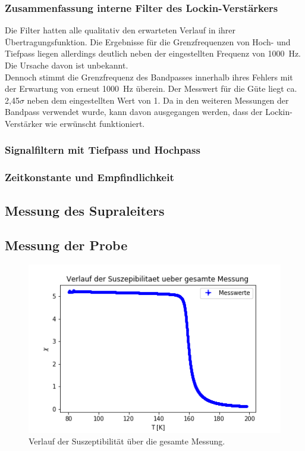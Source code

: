 \documentclass[12pt,a4paper]{article}
\begin{document}
\subsubsection{Zusammenfassung interne Filter des Lockin-Verstärkers}
Die Filter hatten alle qualitativ den erwarteten Verlauf in ihrer Übertragungsfunktion. Die Ergebnisse für die Grenzfrequenzen von Hoch- und Tiefpass liegen allerdings deutlich neben der eingestellten Frequenz von \SI{1000}{Hz}. Die Ursache davon ist unbekannt. \\
Dennoch stimmt die Grenzfrequenz des Bandpasses innerhalb ihres Fehlers mit der Erwartung von erneut \SI{1000}{Hz} überein. Der Messwert für die Güte liegt ca. 2,45$\sigma$ neben dem eingestellten Wert von 1. Da in den weiteren Messungen der Bandpass verwendet wurde, kann davon ausgegangen werden, dass der Lockin-Verstärker wie erwünscht funktioniert.

\subsubsection{Signalfiltern mit Tiefpass und Hochpass}
\subsubsection{Zeitkonstante und Empfindlichkeit}
\subsection{Messung des Supraleiters}
\subsection{Messung der Probe}

\begin{figure}
\centering
\includegraphics[scale=1]{Bilder/Haupt_Probe/Suszeptibilitaet_Verlauf.png}
\caption[test]{Verlauf der Suszeptibilität über die gesamte Messung.}
\label{fig:Suszeptibilitaet_Verlauf}
\end{figure}
\end{document}
